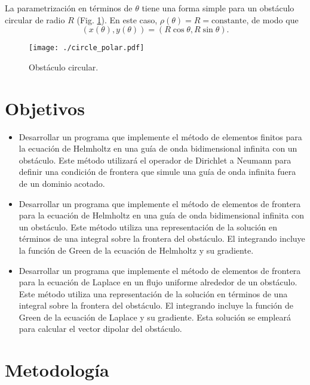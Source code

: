 \documentclass[11pt]{article}
\begin{document}
La parametrización en términos de $\theta$ tiene una forma simple para un obstáculo circular de radio $R$ (Fig. \ref{fig:circle_polar}). En este caso, $\rho(\theta) = R = \mathrm{constante}$, de modo que
\begin{equation}
  \label{eq:40}
  (x(\theta), y(\theta)) = (R\cos\theta, R\sin\theta).
\end{equation}
\begin{figure}[h]
  \centering
  \texttt{[image: ./circle\_polar.pdf]}
  \caption{Obstáculo circular.}
  \label{fig:circle_polar}
\end{figure}




\section{Objetivos}
\begin{itemize}
\item Desarrollar un programa que implemente el método de elementos finitos para la ecuación de Helmholtz en una guía de onda bidimensional infinita con un obstáculo.
Este método utilizará el operador de Dirichlet a Neumann para definir una condición de frontera que simule una guía de onda infinita fuera de un dominio acotado.
  
\item Desarrollar un programa que implemente el método de elementos de frontera para la ecuación de Helmholtz en una guía de onda bidimensional infinita con un obstáculo.
Este método utiliza una representación de la solución en términos de una integral sobre la frontera del obstáculo.
El integrando incluye la función de Green de la ecuación de Helmholtz y su gradiente.

\item Desarrollar un programa que implemente el método de elementos de frontera para la ecuación de Laplace en un flujo uniforme alrededor de un obstáculo.
Este método utiliza una representación de la solución en términos de una integral sobre la frontera del obstáculo.
El integrando incluye la función de Green de la ecuación de Laplace y su gradiente.
Esta solución se empleará para calcular el vector dipolar del obstáculo.
\end{itemize}

\section{Metodología}
\end{document}
